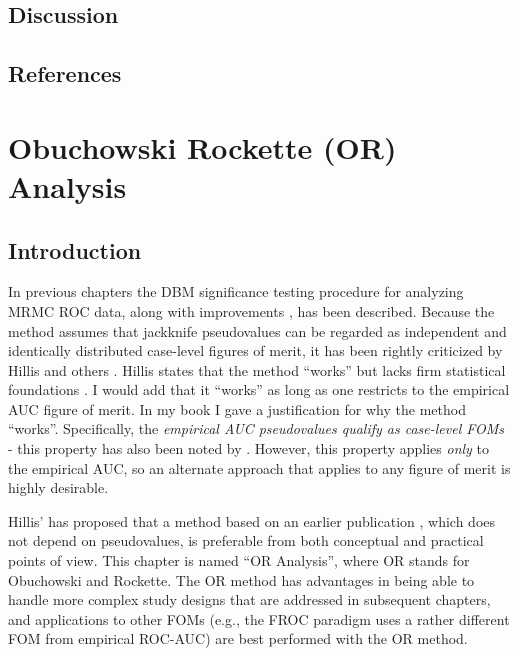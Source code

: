 \documentclass[
]{book}
\begin{document}
\hypertarget{ORMethodIntro-Discussion}{%
\section{Discussion}\label{ORMethodIntro-Discussion}}

\hypertarget{ORMethodIntro-references}{%
\section{References}\label{ORMethodIntro-references}}

\hypertarget{ORAnalysisSigTesting}{%
\chapter{Obuchowski Rockette (OR) Analysis}\label{ORAnalysisSigTesting}}

\hypertarget{ORAnalysisSigTesting-introduction}{%
\section{Introduction}\label{ORAnalysisSigTesting-introduction}}

In previous chapters the DBM significance testing procedure \citep{RN204} for analyzing MRMC ROC data, along with improvements \citep{RN2508}, has been described. Because the method assumes that jackknife pseudovalues can be regarded as independent and identically distributed case-level figures of merit, it has been rightly criticized by Hillis and others \citep{zhou2009statistical}. Hillis states that the method ``works'' but lacks firm statistical foundations \citep{RN1772, RN1865, RN1866}. I would add that it ``works'' as long as one restricts to the empirical AUC figure of merit. In my book I gave a justification for why the method ``works''. Specifically, the \emph{empirical AUC pseudovalues qualify as case-level FOMs} - this property has also been noted by \citep{RN1395}. However, this property applies \emph{only} to the empirical AUC, so an alternate approach that applies to any figure of merit is highly desirable.

Hillis' has proposed that a method based on an earlier publication \citep{RN1450}, which does not depend on pseudovalues, is preferable from both conceptual and practical points of view. This chapter is named ``OR Analysis'', where OR stands for Obuchowski and Rockette. The OR method has advantages in being able to handle more complex study designs \citep{RN2508} that are addressed in subsequent chapters, and applications to other FOMs (e.g., the FROC paradigm uses a rather different FOM from empirical ROC-AUC) are best performed with the OR method.
\end{document}

